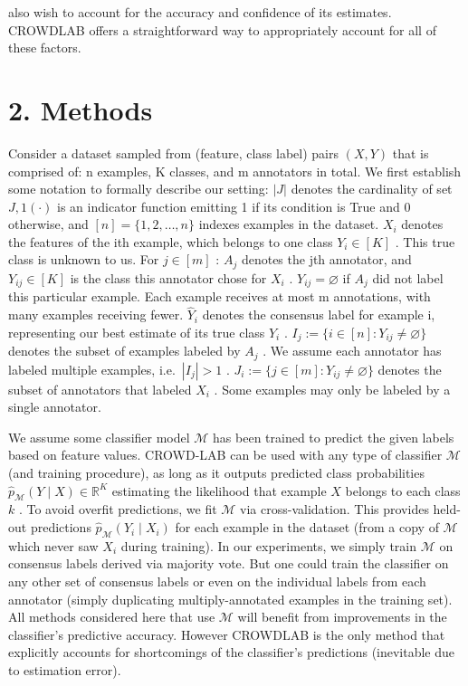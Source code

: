 \documentclass[
]{article}
\begin{document}
also wish to account for the accuracy and confidence of its estimates.
CROWDLAB offers a straightforward way to appropriately account for all
of these factors.

\section{2. Methods}\label{methods}

Consider a dataset sampled from (feature, class label) pairs \((X,Y)\)
that is comprised of: n examples, K classes, and m annotators in total.
We first establish some notation to formally describe our setting:
\(|J|\) denotes the cardinality of set \(J,1(\cdot)\) is an indicator
function emitting 1 if its condition is True and 0 otherwise, and
\([n]=\{1,2,\ldots,n\}\) indexes examples in the dataset. \(X_{i}\)
denotes the features of the ith example, which belongs to one class
\(Y_{i}\in[K]\) . This true class is unknown to us. For \(j\in[m]\) :
\(A_{j}\) denotes the jth annotator, and \(Y_{ij}\in[K]\) is the class
this annotator chose for \(X_{i}\) . \(Y_{ij}=\varnothing\) if \(A_{j}\)
did not label this particular example. Each example receives at most m
annotations, with many examples receiving fewer. \(\hat{Y}_{i}\) denotes
the consensus label for example i, representing our best estimate of its
true class \(Y_{i}\) . \(I_{j}:=\{i\in[n]:Y_{ij}\neq\varnothing\}\)
denotes the subset of examples labeled by \(A_{j}\) . We assume each
annotator has labeled multiple examples, i.e.~\(|I_{j}|>1\) .
\(J_{i}:=\{j\in[m]:Y_{ij}\neq\varnothing\}\) denotes the subset of
annotators that labeled \(X_{i}\) . Some examples may only be labeled by
a single annotator.

We assume some classifier model \(\mathcal{M}\) has been trained to
predict the given labels based on feature values. CROWD-LAB can be used
with any type of classifier \(\mathcal{M}\) (and training procedure), as
long as it outputs predicted class probabilities
\(\widehat{p}_{\mathcal{M}}(Y \mid X) \in \mathbb{R}^K\) estimating the
likelihood that example \(X\) belongs to each class \(k\) . To avoid
overfit predictions, we fit \(\mathcal{M}\) via cross-validation. This
provides held-out predictions
\(\widehat{p}_{\mathcal{M}}(Y_i \mid X_i)\) for each example in the
dataset (from a copy of \(\mathcal{M}\) which never saw \(X_i\) during
training). In our experiments, we simply train \(\mathcal{M}\) on
consensus labels derived via majority vote. But one could train the
classifier on any other set of consensus labels or even on the
individual labels from each annotator (simply duplicating
multiply-annotated examples in the training set). All methods considered
here that use \(\mathcal{M}\) will benefit from improvements in the
classifier's predictive accuracy. However CROWDLAB is the only method
that explicitly accounts for shortcomings of the classifier's
predictions (inevitable due to estimation error).
\end{document}
